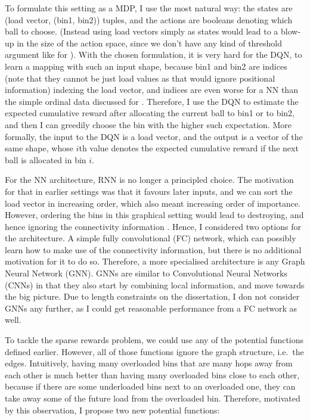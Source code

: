 To formulate this setting as a MDP, I use the most natural way: the states are (load vector, (bin1, bin2)) tuples, and the actions are booleans denoting which ball to choose. (Instead using load vectors simply as states would lead to a blow-up in the size of the action space, since we don't have any kind of threshold argument like for \TwoThinning). With the chosen formulation, it is very hard for the DQN, to learn a mapping with such an input shape, because bin1 and bin2 are indices (note that they cannot be just load values as that would ignore positional information) indexing the load vector, and indices are even worse for a NN than the simple ordinal data discussed for \TwoThinning {}. Therefore, I use the DQN to estimate the expected cumulative reward after allocating the current ball to bin1 or to bin2, and then I can greedily choose the bin with the higher such expectation. More formally, the input to the DQN is a load vector, and the output is a vector of the same shape, whose $i$th value denotes the expected cumulative reward if the next ball is allocated in bin $i$.  


For the NN architecture, RNN is no longer a principled choice. The motivation for that in earlier settings was that it favours later inputs, and we can sort the load vector in increasing order, which also meant increasing order of importance. However, ordering the bins in this graphical setting would lead to destroying, and hence ignoring the connectivity information . Hence, I considered two options for the architecture. A simple fully convolutional (FC) network, which can possibly learn how to make use of the connectivity information, but there is no additional motivation for it to do so. Therefore, a more specialised architecture is any Graph Neural Network (GNN). GNNs are similar to Convolutional Neural Networks (CNNs) in that they also start by combining local information, and move towards the big picture. Due to length constraints on the dissertation, I don not consider GNNs any further, as I could get reasonable performance from a FC network as well. 



To tackle the sparse rewards problem, we could use any of the potential functions defined earlier. However, all of those functions ignore the graph structure, i.e.\ the edges. Intuitively, having many overloaded bins that are many hops away from each other is much better than having many overloaded bins close to each other, because if there are some underloaded bins next to an overloaded one, they can take away some of the future load from the overloaded bin. Therefore, motivated by this observation, I propose two new potential functions:


